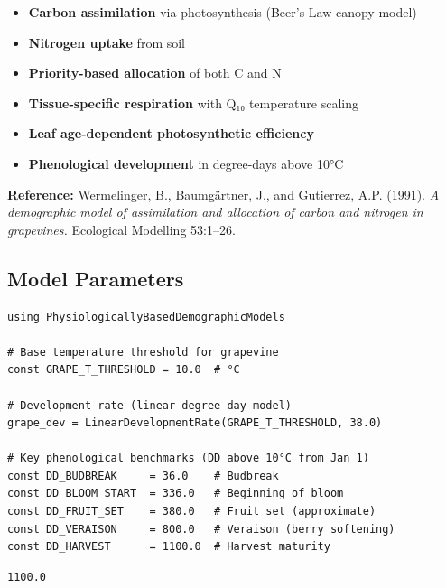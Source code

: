 \begin{itemize}
\item \textbf{Carbon assimilation} via photosynthesis (Beer’s Law canopy model)


\item \textbf{Nitrogen uptake} from soil


\item \textbf{Priority-based allocation} of both C and N


\item \textbf{Tissue-specific respiration} with Q₁₀ temperature scaling


\item \textbf{Leaf age-dependent photosynthetic efficiency}


\item \textbf{Phenological development} in degree-days above 10°C

\end{itemize}


\textbf{Reference:} Wermelinger, B., Baumgärtner, J., and Gutierrez, A.P. (1991). \emph{A demographic model of assimilation and allocation of carbon and nitrogen in grapevines.} Ecological Modelling 53:1–26.



\subsection{Model Parameters}



\label{8409430649752429329}{}



\begin{verbatim}
using PhysiologicallyBasedDemographicModels

# Base temperature threshold for grapevine
const GRAPE_T_THRESHOLD = 10.0  # °C

# Development rate (linear degree-day model)
grape_dev = LinearDevelopmentRate(GRAPE_T_THRESHOLD, 38.0)

# Key phenological benchmarks (DD above 10°C from Jan 1)
const DD_BUDBREAK     = 36.0    # Budbreak
const DD_BLOOM_START  = 336.0   # Beginning of bloom
const DD_FRUIT_SET    = 380.0   # Fruit set (approximate)
const DD_VERAISON     = 800.0   # Veraison (berry softening)
const DD_HARVEST      = 1100.0  # Harvest maturity
\end{verbatim}




\begin{verbatim}
1100.0
\end{verbatim}



